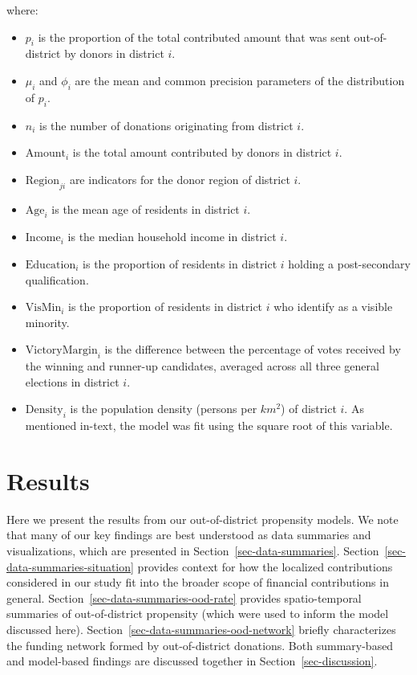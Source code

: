 \documentclass[
  letterpaper,
  DIV=11,
  numbers=noendperiod]{scrartcl}
\providecommand{\tightlist}{%
  \setlength{\itemsep}{0pt}\setlength{\parskip}{0pt}}
\begin{document}
where:

\begin{itemize}
\tightlist
\item
  \(p_i\) is the proportion of the total contributed amount that was
  sent out-of-district by donors in district \(i\).
\item
  \(\mu_i\) and \(\phi_i\) are the mean and common precision parameters
  of the distribution of \(p_i\).
\item
  \(n_i\) is the number of donations originating from district \(i\).
\item
  \(\text{Amount}_i\) is the total amount contributed by donors in
  district \(i\).
\item
  \(\text{Region}_{ji}\) are indicators for the donor region of district
  \(i\).
\item
  \(\text{Age}_i\) is the mean age of residents in district \(i\).
\item
  \(\text{Income}_i\) is the median household income in district \(i\).
\item
  \(\text{Education}_i\) is the proportion of residents in district
  \(i\) holding a post-secondary qualification.
\item
  \(\text{VisMin}_i\) is the proportion of residents in district \(i\)
  who identify as a visible minority.
\item
  \(\text{VictoryMargin}_i\) is the difference between the percentage of
  votes received by the winning and runner-up candidates, averaged
  across all three general elections in district \(i\).
\item
  \(\text{Density}_i\) is the population density (persons per \(km^2\))
  of district \(i\). As mentioned in-text, the model was fit using the
  square root of this variable.
\end{itemize}

\section{Results}\label{sec-results}

Here we present the results from our out-of-district propensity models.
We note that many of our key findings are best understood as data
summaries and visualizations, which are presented in
Section~\ref{sec-data-summaries}.
Section~\ref{sec-data-summaries-situation} provides context for how the
localized contributions considered in our study fit into the broader
scope of financial contributions in general.
Section~\ref{sec-data-summaries-ood-rate} provides spatio-temporal
summaries of out-of-district propensity (which were used to inform the
model discussed here). Section~\ref{sec-data-summaries-ood-network}
briefly characterizes the funding network formed by out-of-district
donations. Both summary-based and model-based findings are discussed
together in Section~\ref{sec-discussion}.
\end{document}
